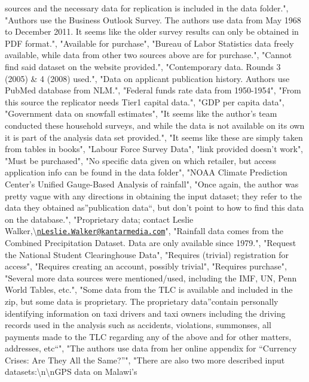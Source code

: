 \documentclass[]{article}
\begin{document}
\begin{itemize}
  sources and the necessary data for replication is included in the data
  folder.", "Authors use the Business Outlook Survey. The authors use
  data from May 1968 to December 2011. It seems like the older survey
  results can only be obtained in PDF format.", "Available for
  purchase", "Bureau of Labor Statistics data freely available, while
  data from other two sources above are for purchase.", "Cannot find
  said dataset on the website provided.", "Contemporary data. Rounds 3
  (2005) \& 4 (2008) used.", "Data on applicant publication history.
  Authors use PubMed database from NLM.", "Federal funds rate data from
  1950-1954", "From this source the replicator needs Tier1 capital
  data.", "GDP per capita data", "Government data on snowfall
  estimates", "It seems like the author's team conducted these household
  surveys, and while the data is not available on its own it is part of
  the analysis data set provided.", "It seems like these are simply
  taken from tables in books", "Labour Force Survey Data", "link
  provided doesn't work", "Must be purchased", "No specific data given
  on which retailer, but access application info can be found in the
  data folder", "NOAA Climate Prediction Center's Unified Gauge-Based
  Analysis of rainfall", "Once again, the author was pretty vague with
  any directions in obtaining the input dataset; they refer to the data
  they obtained as''publication data``, but don't point to how to find
  this data on the database.", "Proprietary data; contact Leslie
  Walker,\textbackslash{}\href{mailto:nLeslie.Walker@kantarmedia.com}{\nolinkurl{nLeslie.Walker@kantarmedia.com}}",
  "Rainfall data comes from the Combined Precipitation Dataset. Data are
  only available since 1979.", "Request the National Student
  Clearinghouse Data", "Requires (trivial) registration for access",
  "Requires creating an account, possibly trivial", "Requires purchase",
  "Several more data sources were mentioned/used, including the IMF, UN,
  Penn World Tables, etc.", "Some data from the TLC is available and
  included in the zip, but some data is proprietary. The proprietary
  data''contain personally identifying information on taxi drivers and
  taxi owners including the driving records used in the analysis such as
  accidents, violations, summonses, all payments made to the TLC
  regarding any of the above and for other matters, addresses, etc``",
  "The authors use data from her online appendix for ``Currency Crises:
  Are They All the Same?''", "There are also two more described input
  datasets:\textbackslash{}n\textbackslash{}nGPS data on Malawi's

\end{itemize}
\end{document}
